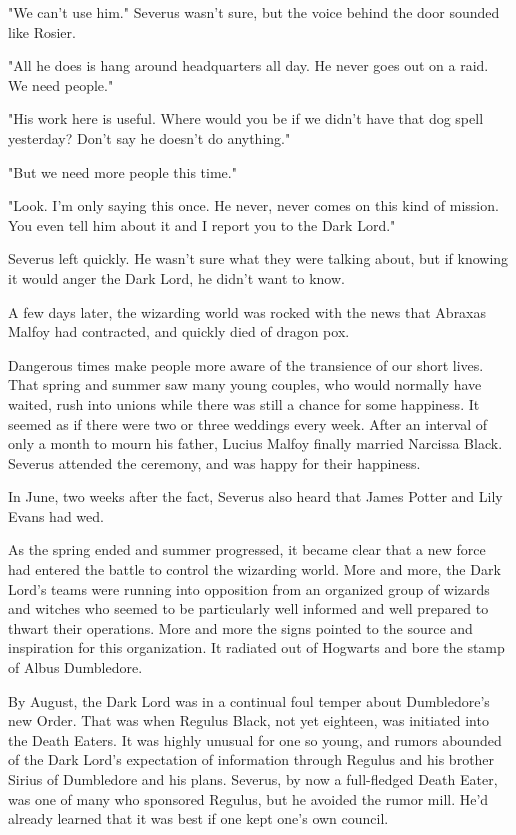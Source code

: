 "We can't use him." Severus wasn't sure, but the voice behind the door sounded like Rosier.

"All he does is hang around headquarters all day. He never goes out on a raid. We need people."

"His work here is useful. Where would you be if we didn't have that dog spell yesterday? Don't say he doesn't do anything."

"But we need more people this time."

"Look. I'm only saying this once. He never, never comes on this kind of mission. You even tell him about it and I report you to the Dark Lord."

Severus left quickly. He wasn't sure what they were talking about, but if knowing it would anger the Dark Lord, he didn't want to know.

A few days later, the wizarding world was rocked with the news that Abraxas Malfoy had contracted, and quickly died of dragon pox.

Dangerous times make people more aware of the transience of our short lives. That spring and summer saw many young couples, who would normally have waited, rush into unions while there was still a chance for some happiness. It seemed as if there were two or three weddings every week. After an interval of only a month to mourn his father, Lucius Malfoy finally married Narcissa Black. Severus attended the ceremony, and was happy for their happiness.

In June, two weeks after the fact, Severus also heard that James Potter and Lily Evans had wed.

As the spring ended and summer progressed, it became clear that a new force had entered the battle to control the wizarding world. More and more, the Dark Lord's teams were running into opposition from an organized group of wizards and witches who seemed to be particularly well informed and well prepared to thwart their operations. More and more the signs pointed to the source and inspiration for this organization. It radiated out of Hogwarts and bore the stamp of Albus Dumbledore.

By August, the Dark Lord was in a continual foul temper about Dumbledore's new Order. That was when Regulus Black, not yet eighteen, was initiated into the Death Eaters. It was highly unusual for one so young, and rumors abounded of the Dark Lord's expectation of information through Regulus and his brother Sirius of Dumbledore and his plans. Severus, by now a full-fledged Death Eater, was one of many who sponsored Regulus, but he avoided the rumor mill. He'd already learned that it was best if one kept one's own council.

